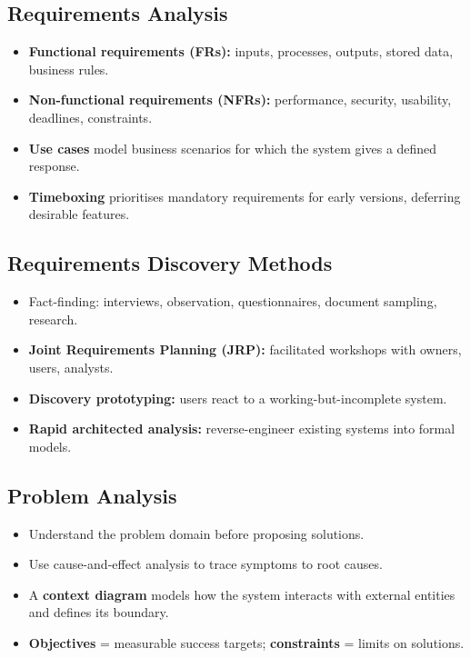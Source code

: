 \documentclass[hidelinks]{article}
\begin{document}
\subsection{Requirements Analysis}
\begin{itemize}
  \item \textbf{Functional requirements (FRs):} inputs, processes, outputs, stored data, business rules.
  \item \textbf{Non-functional requirements (NFRs):} performance, security, usability, deadlines,
        constraints.
  \item \textbf{Use cases} model business scenarios for which the system gives a defined response.
  \item \textbf{Timeboxing} prioritises mandatory requirements for early versions, deferring
        desirable features.
\end{itemize}

\subsection{Requirements Discovery Methods}
\begin{itemize}
  \item Fact-finding: interviews, observation, questionnaires, document sampling, research.
  \item \textbf{Joint Requirements Planning (JRP):} facilitated workshops with owners, users, analysts.
  \item \textbf{Discovery prototyping:} users react to a working-but-incomplete system.
  \item \textbf{Rapid architected analysis:} reverse-engineer existing systems into formal models.
\end{itemize}

\subsection{Problem Analysis}
\begin{itemize}
  \item Understand the problem domain before proposing solutions.
  \item Use cause-and-effect analysis to trace symptoms to root causes.
  \item A \textbf{context diagram} models how the system interacts with external entities and
        defines its boundary.
  \item \textbf{Objectives} = measurable success targets; \textbf{constraints} = limits on solutions.
\end{itemize}
\end{document}
